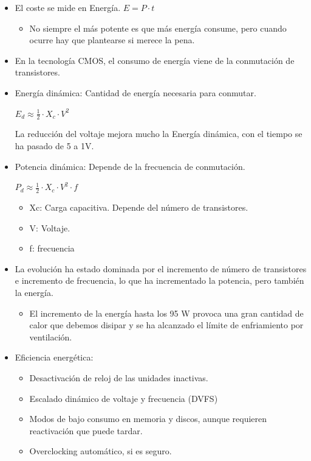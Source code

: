 \documentclass[12pt, twoside, openright]{report} %
\begin{document}
\begin{itemize}

	\item El coste se mide en Energía. \(E= P \cdot t\)

	      \begin{itemize}

		      \item No siempre el más potente es que más energía consume, pero cuando
		            ocurre hay que plantearse si merece la pena.
	      \end{itemize}
	\item En la tecnología CMOS, el consumo de energía viene de la conmutación
	      de transistores.
	\item Energía dinámica: Cantidad de energía necesaria para conmutar.



	      \(E_d \approx \frac 1 2 \cdot X_c\cdot V^2\)

	      La reducción del voltaje mejora mucho la Energía dinámica, con el
	      tiempo se ha pasado de 5 a 1V.

	\item Potencia dinámica: Depende de la frecuencia de conmutación.



	      \(P_d \approx \frac 1 2 \cdot X_c\cdot V^2\cdot f\)

	      \begin{itemize}

		      \item Xc: Carga capacitiva. Depende del número de transistores.
		      \item V: Voltaje.
		      \item f: frecuencia
	      \end{itemize}
	\item La evolución ha estado dominada por el incremento de número de
	      transistores e incremento de frecuencia, lo que ha incrementado la
	      potencia, pero también la energía.

	      \begin{itemize}

		      \item El incremento de la energía hasta los 95 W provoca una gran
		            cantidad de calor que debemos disipar y se ha alcanzado el límite
		            de enfriamiento por ventilación.
	      \end{itemize}
	\item Eficiencia energética:

	      \begin{itemize}

		      \item Desactivación de reloj de las unidades inactivas.
		      \item Escalado dinámico de voltaje y frecuencia (DVFS)
		      \item Modos de bajo consumo en memoria y discos, aunque requieren
		            reactivación que puede tardar.
		      \item Overclocking automático, si es seguro.
	      \end{itemize}
\end{itemize}
\end{document}
